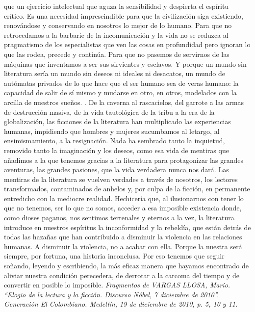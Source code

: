 \documentclass[a4paper,10pt]{article}
\begin{document}
que un ejercicio intelectual que aguza la sensibilidad y despierta el espíritu crítico. Es una necesidad imprescindible para que la civilización siga existiendo, renovándose y conservando en nosotros lo mejor de lo humano. Para que no retrocedamos a la barbarie de la incomunicación y la vida no se reduzca al pragmatismo de los especialistas que ven las cosas en profundidad pero ignoran lo que las rodea, precede y continúa. Para que no pasemos de servirnos de las máquinas que inventamos a ser sus sirvientes y esclavos. Y porque un mundo sin literatura sería un mundo sin deseos ni ideales ni desacatos, un mundo de autómatas privados de lo que hace que el ser humano sea de veras humano: la capacidad de salir de sí mismo y mudarse en otro, en otros, modelados con la arcilla de nuestros sueños. . De la caverna al rascacielos, del garrote a las armas de destrucción masiva, de la vida tautológica de la tribu a la era de la globalización, las ficciones de la literatura han multiplicado las experiencias humanas, impidiendo que hombres y mujeres sucumbamos al letargo, al ensimismamiento, a la resignación. Nada ha sembrado tanto la inquietud, removido tanto la imaginación y los deseos, como esa vida de mentiras que añadimos a la que tenemos gracias a la literatura para protagonizar las grandes aventuras, las grandes pasiones, que la vida verdadera nunca nos dará. Las mentiras de la literatura se vuelven verdades a través de nosotros, los lectores transformados, contaminados de anhelos y, por culpa de la ficción, en permanente entredicho con la mediocre realidad. Hechicería que, al ilusionarnos con tener lo que no tenemos, ser lo que no somos, acceder a esa imposible existencia donde, como dioses paganos, nos sentimos terrenales y eternos a la vez, la literatura introduce en nuestros espíritus la inconformidad y la rebeldía, que están detrás de todas las hazañas que han contribuido a disminuir la violencia en las relaciones humanas. A disminuir la violencia, no a acabar con ella. Porque la nuestra será siempre, por fortuna, una historia inconclusa. Por eso tenemos que seguir soñando, leyendo y escribiendo, la más eficaz manera que hayamos encontrado de aliviar nuestra condición perecedera, de derrotar a la carcoma del tiempo y de convertir en posible lo imposible. \newline \textsl{ Fragmentos de VARGAS LLOSA, Mario. “Elogio de la lectura y la ficción. Discurso Nóbel, 7 diciembre de 2010”. Generación  El Colombiano. Medellín, 19 de diciembre de 2010, p. 5, 10 y 11. } \newline 
\end{document}

